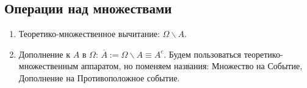 \documentclass[a4paper, 12pt]{article}
\theoremstyle{definition}
\begin{document}
\begin{enumerate}
	\subsection{Операции над множествами}
	\begin{enumerate}
		\item Теоретико-множественное вычитание: $\Omega \backslash A$.
		\item Дополнение к $A$ в $\Omega$: $\overline{A}:=\Omega \backslash A\equiv A^c$. Будем пользоваться теоретико-множественным аппаратом, но поменяем названия: Множество на Событие, Дополнение на Противоположное событие.
		\begin{figure}[h]
			\centering
			\qquad

\end{figure}
\end{enumerate}
\end{enumerate}
\end{document}
